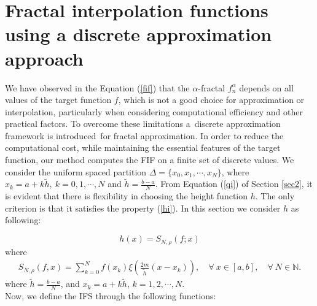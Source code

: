 \documentclass{article}[12pt, a4]
\begin{document}
	
	\section{Fractal interpolation functions using a discrete approximation approach} \label{sec5}
	We have observed in the Equation (\ref{fif}) that the $\alpha$-fractal $f_{n}^{\alpha}$ depends on all values of the target function $f$, which is not a good choice for approximation or interpolation, particularly when considering computational efficiency and other practical factors. To overcome these limitations  a discrete approximation framework is introduced for fractal approximation. In order to reduce the computational cost, while maintaining the essential features of the target function, our method computes the FIF on a finite set of discrete values. We consider the uniform spaced partition $\Delta= \{x_0, x_1, \cdots, x_N\}$, where $x_k = a+k\tilde{h}, ~ k=0,1,\cdots, N$ and $\tilde{h}=\frac{b-a}{N}$.
	From Equation (\ref{qi}) of Section \ref{sec2}, it is evident that there is flexibility in choosing the height function $h$. The only criterion is that it satisfies the property (\ref{hi}). In this section we consider $h$ as following:
	
	\begin{equation}
		h(x)=S_{N,\rho}(f;x)
	\end{equation}
	where 
	\begin{align}
		S_{N,\rho}(f, x)= \sum_{k=0}^{N}f(x_k)\xi\left(\frac{2m}{\tilde{h}}(x-x_k)\right),\quad \forall~ x \in [a,b], \quad\forall ~N \in \mathbb{N} . 
	\end{align}
	where $\tilde{h}=\frac{b-a}{N}$, and $x_k=a+k\tilde{h}$, $k=1,2,\cdots, N$.\\
	
	Now, we define the IFS through the following functions:
	
\end{document}
